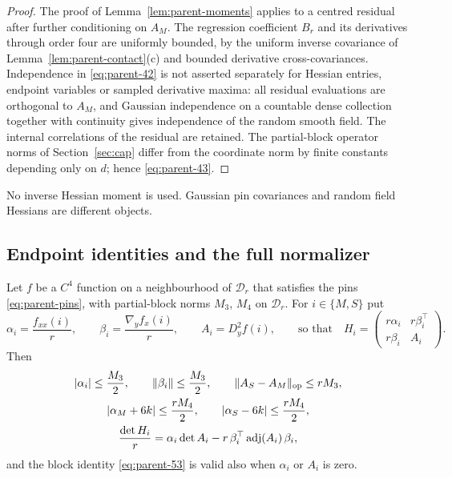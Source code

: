 \begin{proof}
The proof of Lemma~\ref{lem:parent-moments} applies to a centred residual after further conditioning on $A_M$. The regression coefficient $B_r$ and its derivatives through order four are uniformly bounded, by the uniform inverse covariance of Lemma~\ref{lem:parent-contact}(c) and bounded derivative cross-covariances. Independence in \eqref{eq:parent-42} is not asserted separately for Hessian entries, endpoint variables or sampled derivative maxima: all residual evaluations are orthogonal to $A_M$, and Gaussian independence on a countable dense collection together with continuity gives independence of the random smooth field. The internal correlations of the residual are retained. The partial-block operator norms of Section~\ref{sec:cap} differ from the coordinate norm by finite constants depending only on $d$; hence \eqref{eq:parent-43}.
\end{proof}

No inverse Hessian moment is used. Gaussian pin covariances and random field Hessians are different objects.

\subsection{Endpoint identities and the full normalizer}\label{ssec:parent-normalizer}

\begin{lemma}\label{lem:parent-endpoint}
Let $f$ be a $C^4$ function on a neighbourhood of $\mathcal D_r$ that satisfies the pins \eqref{eq:parent-pins}, with partial-block norms $M_3$, $M_4$ on $\mathcal D_r$. For $i\in\{M,S\}$ put
\[
\alpha_i=\frac{f_{xx}(i)}r,\qquad \beta_i=\frac{\nabla_yf_x(i)}r,\qquad A_i=D_y^2f(i),\qquad\text{so that}\quad H_i=\begin{pmatrix}r\alpha_i&r\beta_i^{\top}\\ r\beta_i&A_i\end{pmatrix}.
\]
Then
\begin{gather}
|\alpha_i|\le\frac{M_3}2,\qquad \|\beta_i\|\le\frac{M_3}2,\qquad \|A_S-A_M\|_{\rm op}\le rM_3,\label{eq:parent-51}\\
|\alpha_M+6k|\le\frac{rM_4}2,\qquad |\alpha_S-6k|\le\frac{rM_4}2,\label{eq:parent-52}\\
\frac{\det H_i}r=\alpha_i\det A_i-r\,\beta_i^{\top}\operatorname{adj}(A_i)\,\beta_i ,\label{eq:parent-53}
\end{gather}
and the block identity \eqref{eq:parent-53} is valid also when $\alpha_i$ or $A_i$ is zero.
\end{lemma}

